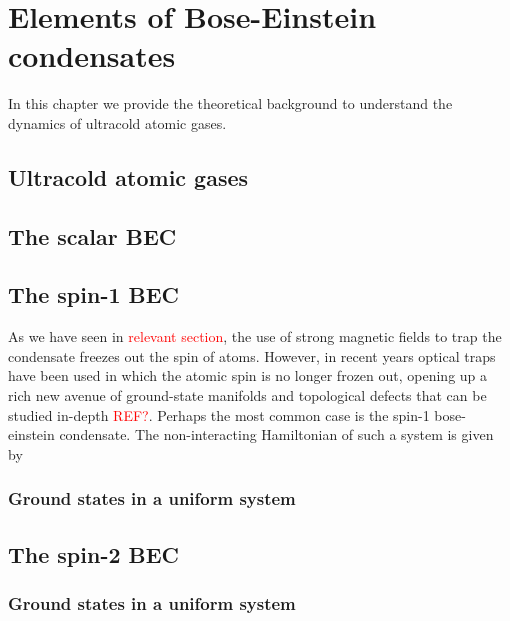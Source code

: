 \chapter{Elements of Bose-Einstein condensates}

In this chapter we provide the theoretical background to understand the 
dynamics of ultracold atomic gases.


\section{Ultracold atomic gases}


\section{The scalar BEC}

\section{The spin-1 BEC}
As we have seen in \textcolor{red}{relevant section}, the use of strong 
magnetic fields to trap the condensate freezes out the spin of atoms.
However, in recent years optical traps have been used in which the atomic 
spin is no longer frozen out, opening up a rich new avenue of ground-state
manifolds and topological defects that can be studied in-depth
\textcolor{red}{REF?}.
Perhaps the most common case is the spin-1 bose-einstein condensate.
The non-interacting Hamiltonian of such a system is given by

\subsection{Ground states in a uniform system}

\section{The spin-2 BEC}
\subsection{Ground states in a uniform system}
